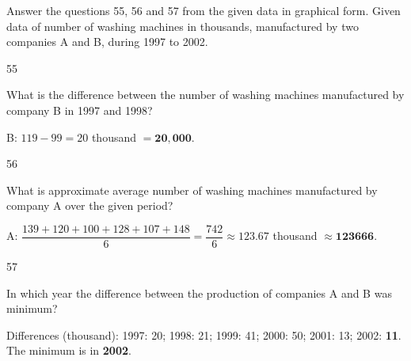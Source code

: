 \begin{context}
Answer the questions 55, 56 and 57 from the given data in graphical form. Given data of number of washing machines in thousands, manufactured by two companies A and B, during 1997 to 2002.
\begin{center}
\end{center}
\end{context}
\begin{question}{55}
{What is the difference between the number of washing machines manufactured by company B in 1997 and 1998?\par}
\begin{explain}
B: $119-99=20$ thousand $=\mathbf{20{,}000}$.
\end{explain}
\end{question}

\begin{question}{56}
{What is approximate average number of washing machines manufactured by company A over the given period?\par}
\begin{explain}
A: $\dfrac{139+120+100+128+107+148}{6}=\dfrac{742}{6}\approx123.67$ thousand $\approx\mathbf{123666}$.
\end{explain}
\end{question}

\begin{question}{57}
{In which year the difference between the production of companies A and B was minimum?\par}
\begin{explain}
Differences (thousand): 1997: 20; 1998: 21; 1999: 41; 2000: 50; 2001: 13; 2002: \textbf{11}. The minimum is in \textbf{2002}.
\end{explain}
\end{question}

